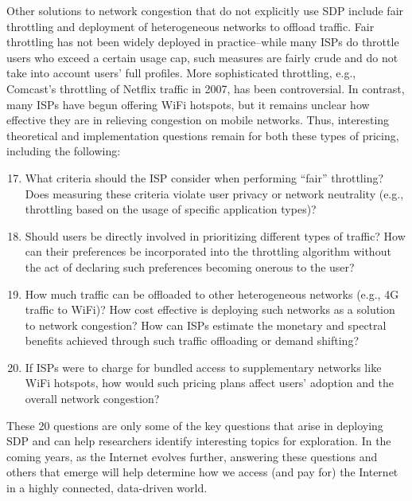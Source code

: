 Other solutions to network congestion that do not explicitly use SDP include fair throttling and deployment of heterogeneous networks to offload traffic. Fair throttling has not been widely deployed in practice--while many ISPs do throttle users who exceed a certain usage cap, such measures are fairly crude and do not take into account users' full profiles. More sophisticated throttling, e.g., Comcast's throttling of Netflix traffic in 2007, has been controversial. In contrast, many ISPs have begun offering WiFi hotspots, but it remains unclear how effective they are in relieving congestion on mobile networks. Thus, interesting theoretical and implementation questions remain for both these types of pricing, including the following:
\begin{enumerate}
\setcounter{enumi}{16}
\item
What criteria should the ISP consider when performing ``fair'' throttling? Does measuring these criteria violate user privacy or network neutrality (e.g., throttling based on the usage of specific application types)?
\item
Should users be directly involved in prioritizing different types of traffic? How can their preferences be incorporated into the throttling algorithm without the act of declaring such preferences becoming onerous to the user?
\item
How much traffic can be offloaded to other heterogeneous networks (e.g., 4G traffic to WiFi)? How cost effective is deploying such networks as a solution to network congestion? How can ISPs estimate the monetary and spectral benefits achieved through such traffic offloading or demand shifting?
\item
If ISPs were to charge for bundled access to supplementary networks like WiFi hotspots, how would such pricing plans affect users' adoption and the overall network congestion?
\end{enumerate}

These 20 questions are only some of the key questions that arise in deploying SDP and can help researchers identify interesting topics for exploration. In the coming years, as the Internet evolves further, answering these questions and others that emerge will help determine how we access (and pay for) the Internet in a highly connected, data-driven world. 
